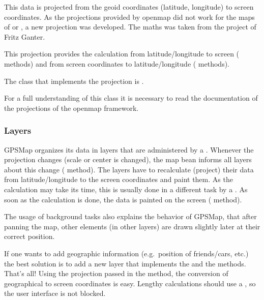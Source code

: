 \documentclass[a4paper]{article} %
\begin{document}
This data is projected from the geoid coordinates (latitude,
longitude) to screen coordinates. As the projections provided by
openmap did not work for the maps of
 or
, a new projection was
developed. The maths was taken from the
 project of Fritz
Ganter.

This projection provides the calculation from latitude/longitude to
screen ( methods) and from screen coordinates to
latitude/longitude ( methods).

The class that implements the projection is
. 

For a full understanding of this class it is necessary to read the
documentation of the projections of the openmap framework.

\subsubsection{Layers}
\label{SoftwareDesignOfTheGpstoolPackage-Layers}

GPSMap organizes its data in layers that are administered by a
. Whenever the projection changes
(scale or center is changed), the map bean informs all layers about
this change ( method). The layers have
to recalculate (project) their data from latitude/longitude to the
screen coordinates and paint them. As the calculation may take its
time, this is usually done in a different task by a
. As soon as the calculation is done, the data
is painted on the screen ( method).

The usage of background tasks also explains the behavior of GPSMap,
that after panning the map, other elements (in other layers) are drawn
slightly later at their correct position.

If one wants to add geographic information (e.g.~position of
friends/cars, etc.) the best solution is to add a new layer that
implements the  and the
 methods. That's all! Using the projection
passed in the  method, the conversion of
geographical to screen coordinates is easy. Lengthy calculations
should use a , so the user interface is not
blocked. 
\end{document}

